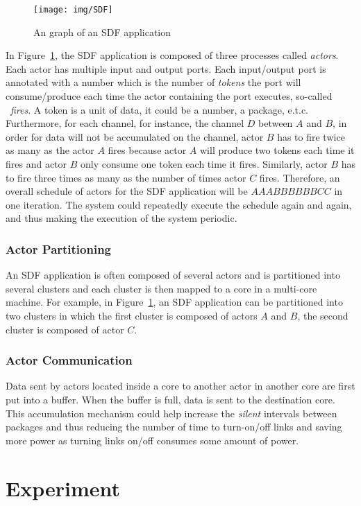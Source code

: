 \documentclass[12pt]{article}
\begin{document}
\begin{figure}[ht!]
\centering
\texttt{[image: img/SDF]}
\caption{An graph of an SDF application}\label{fig:SDF}
\end{figure}

In Figure~\ref{fig:SDF}, the SDF application is composed of three processes
called \textit{actors}. Each actor has multiple input and output ports. Each
input/output port is annotated with a number which is the number of
\textit{tokens} the port will consume/produce each time the actor containing the
port executes, so-called ~\textit{fires}. A token is a unit of data, it could be
a number, a package, e.t.c. Furthermore, for each channel, for instance, the
channel $D$ between $A$ and $B$, in order for data will not be accumulated on
the channel, actor $B$ has to fire twice as many as the actor $A$ fires because
actor $A$ will produce two tokens each time it fires and actor $B$ only consume
one token each time it fires. Similarly, actor $B$ has to fire three times as
many as the number of times actor $C$ fires. Therefore, an overall schedule of
actors for the SDF application will be $AAABBBBBBCC$ in one iteration. The
system could repeatedly execute the schedule again and again, and thus making
the execution of the system periodic.

\subsubsection{Actor Partitioning}
An SDF application is often composed of several actors and is partitioned into
several clusters and each cluster is then mapped to a core in a multi-core
machine. For example, in Figure~\ref{fig:SDF}, an SDF application can be partitioned into
two clusters in which the first cluster is composed of actors $A$ and $B$, the
second cluster is composed of actor $C$.  

\subsubsection{Actor Communication}
Data sent by actors located inside a core to another actor in another core are
first put into a buffer. When the buffer is full, data is sent to the
destination core. This accumulation mechanism could help increase the
\textit{silent} intervals between packages and thus reducing the number of time
to turn-on/off links and saving more power as turning links on/off consumes some
amount of power.


\section{Experiment}
\end{document}
